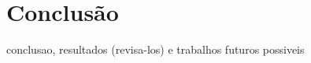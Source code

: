 \chapter{Conclusão} \label{cap:c}

conclusao,
resultados (revisa-los)
e trabalhos futuros possiveis
